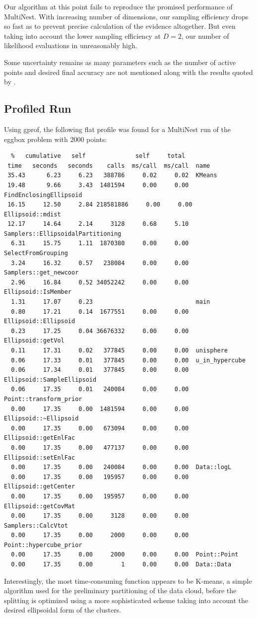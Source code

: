 \documentclass{article}
\begin{document}
Our algorithm at this point fails to reproduce the promised performance of MultiNest. With increasing number of dimensions, our sampling efficiency drops so fast as to prevent precise calculation of the evidence altogether. But even taking into account the lower sampling efficiency at $D=2$, our number of likelihood evaluations in unreasonably high.

Some uncertainty remains as many parameters such as the number of active points and desired final accuracy are not mentioned along with the results quoted by \cite{2009MNRAS.398.1601F}.

\subsection{Profiled Run}
Using gprof, the following flat profile was found for a MultiNest run of the eggbox problem with 2000 points:

\begin{verbatim}
  %   cumulative   self              self     total           
 time   seconds   seconds    calls  ms/call  ms/call  name    
 35.43      6.23     6.23   388786     0.02     0.02  KMeans
 19.48      9.66     3.43  1481594     0.00     0.00  FindEnclosingEllipsoid
 16.15     12.50     2.84 218581886     0.00     0.00  Ellipsoid::mdist
 12.17     14.64     2.14     3128     0.68     5.10  Samplers::EllipsoidalPartitioning
  6.31     15.75     1.11  1870380     0.00     0.00  SelectFromGrouping
  3.24     16.32     0.57   238084     0.00     0.00  Samplers::get_newcoor
  2.96     16.84     0.52 34052242     0.00     0.00  Ellipsoid::IsMember
  1.31     17.07     0.23                             main
  0.80     17.21     0.14  1677551     0.00     0.00  Ellipsoid::Ellipsoid
  0.23     17.25     0.04 36676332     0.00     0.00  Ellipsoid::getVol
  0.11     17.31     0.02   377845     0.00     0.00  unisphere
  0.06     17.33     0.01   377845     0.00     0.00  u_in_hypercube
  0.06     17.34     0.01   377845     0.00     0.00  Ellipsoid::SampleEllipsoid
  0.06     17.35     0.01   240084     0.00     0.00  Point::transform_prior
  0.00     17.35     0.00  1481594     0.00     0.00  Ellipsoid::~Ellipsoid
  0.00     17.35     0.00   673094     0.00     0.00  Ellipsoid::getEnlFac
  0.00     17.35     0.00   477137     0.00     0.00  Ellipsoid::setEnlFac
  0.00     17.35     0.00   240084     0.00     0.00  Data::logL
  0.00     17.35     0.00   195957     0.00     0.00  Ellipsoid::getCenter
  0.00     17.35     0.00   195957     0.00     0.00  Ellipsoid::getCovMat
  0.00     17.35     0.00     3128     0.00     0.00  Samplers::CalcVtot
  0.00     17.35     0.00     2000     0.00     0.00  Point::hypercube_prior
  0.00     17.35     0.00     2000     0.00     0.00  Point::Point
  0.00     17.35     0.00        1     0.00     0.00  Data::Data
\end{verbatim}
Interestingly, the most time-consuming function appears to be K-means, a simple algorithm used for the preliminary partitioning of the data cloud, before the splitting is optimized using a more sophisticated scheme taking into account the desired ellipsoidal form of the clusters.
\end{document}
